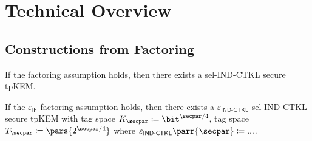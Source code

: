 \section{Technical Overview}
\label{sec:overview}


\subsection{Constructions from Factoring}

\begin{theorem}[Informal]
    If the factoring assumption holds,
    then there exists a sel-IND-CTKL secure tpKEM.
\end{theorem}

\begin{theorem}
    If the \(\varepsilon_{\textsf{IF}}\)-factoring assumption holds,
    then there exists a \(\varepsilon_{\textsf{IND-CTKL}}\)-sel-IND-CTKL secure tpKEM with tag space \(K_\secpar \coloneqq \bit^{\secpar/4}\),
    tag space \(T_\secpar \coloneqq \pars{2^{\secpar/4}}\) where \(\varepsilon_{\textsf{IND-CTKL}}\parr{\secpar} \coloneqq ...\).
\end{theorem}


